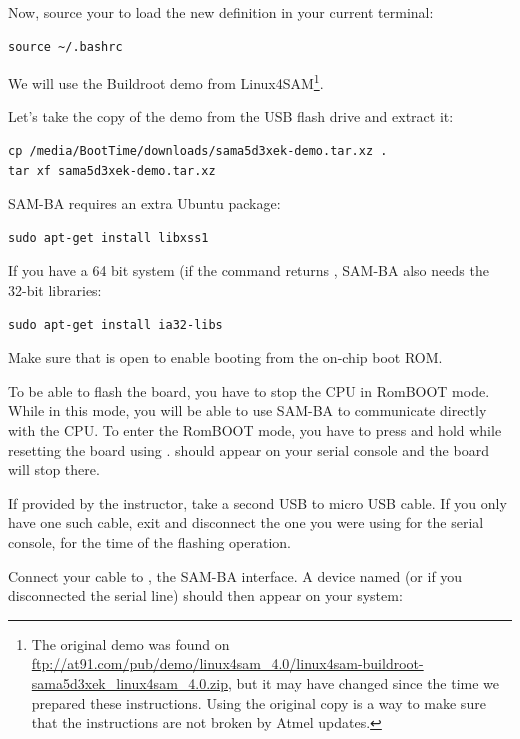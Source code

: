 Now, source your  to load the new definition in your
current terminal:
\begin{verbatim}
source ~/.bashrc
\end{verbatim}

We will use the Buildroot demo from Linux4SAM\footnote{The original demo
was found on
\url{ftp://at91.com/pub/demo/linux4sam_4.0/linux4sam-buildroot-sama5d3xek_linux4sam_4.0.zip},
but it may have changed since the time we prepared these instructions.
Using the original copy is a way to make sure that the instructions are
not broken by Atmel updates.}.

Let's take the copy of the demo from the USB flash drive and extract it:

\begin{verbatim}
cp /media/BootTime/downloads/sama5d3xek-demo.tar.xz .
tar xf sama5d3xek-demo.tar.xz
\end{verbatim}

SAM-BA requires an extra Ubuntu package:

\begin{verbatim}
sudo apt-get install libxss1
\end{verbatim}

If you have a 64 bit system (if the  command returns
, SAM-BA also needs the 32-bit libraries:

\begin{verbatim}
sudo apt-get install ia32-libs
\end{verbatim}

Make sure that  is open to enable booting from the 
on-chip boot ROM.

To be able to flash the board, you have to stop the CPU in RomBOOT
mode. While in this mode, you will be able to use SAM-BA to
communicate directly with the CPU. To enter the RomBOOT mode, you have to
press and hold  while resetting the board using .
 should appear on your serial console and the board will
stop there.

If provided by the instructor, take a second USB to micro USB cable.
If you only have one such cable, exit  and disconnect
the one you were using for the serial console, for the time of the
flashing operation.

Connect your cable to , the SAM-BA interface. A device named
 (or  if you disconnected the
serial line) should then appear on your system:

